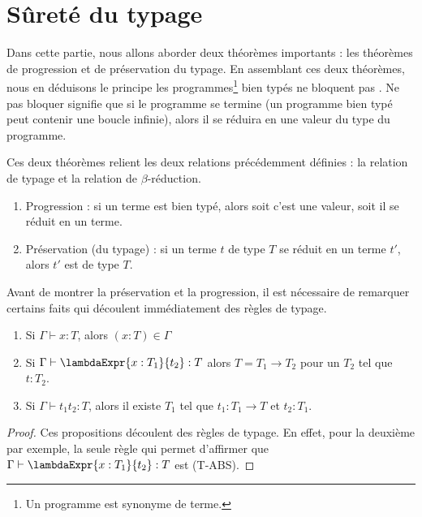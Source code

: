 \section{Sûreté du typage}

Dans cette partie, nous allons aborder deux théorèmes importants : les
théorèmes de progression et de préservation du typage. En assemblant ces deux
théorèmes, nous en déduisons le principe \og les
programmes\footnote{Un programme est synonyme de terme.}
bien typés ne bloquent pas \fg. Ne pas bloquer signifie que si le programme se
termine (un programme bien typé peut contenir une boucle infinie), alors il
se réduira en une valeur du type du programme.

Ces deux théorèmes relient les deux relations précédemment définies : la
relation de typage et la relation de $\beta$-réduction.

\begin{enumerate}
  \item Progression : si un terme est bien typé, alors soit c'est une
    valeur, soit il se réduit en un terme.
    \item Préservation (du typage) : si un terme $t$ de type $T$ se réduit en un terme $t'$,
      alors $t'$ est de type $T$.
\end{enumerate}

Avant de montrer la préservation et la progression, il est nécessaire de
remarquer certains faits qui découlent immédiatement des règles de typage.

\begin{lemma} 
  \label{lemma:simply-typed-lambda-calculus-inversion}
  \begin{enumerate}
    \item Si $\Gamma \vdash x : T$, alors $(x : T) \in \Gamma$
    \item Si $\Gamma \vdash \lambdaExpr{x : T_{1}}{t_{2}} : T$ alors $T = T_{1}
      \rightarrow T_{2}$ pour un $T_{2}$ tel que $t : T_{2}$.
    \item Si $\Gamma \vdash t_{1} t_{2} : T$, alors il existe $T_{1}$
      tel que $t_{1} : T_{1} \rightarrow T$ et $t_{2} : T_{1}$.
  \end{enumerate}
\end{lemma}

\begin{proof}
  \label{proof:simply-typed-lambda-calculus-inversion}
  Ces propositions découlent des règles de typage. En effet, pour la deuxième
  par exemple, la seule règle qui permet d'affirmer que $\Gamma \vdash
  \lambdaExpr{x : T_{1}}{t_{2}} : T$ est (T-ABS).
\end{proof}

